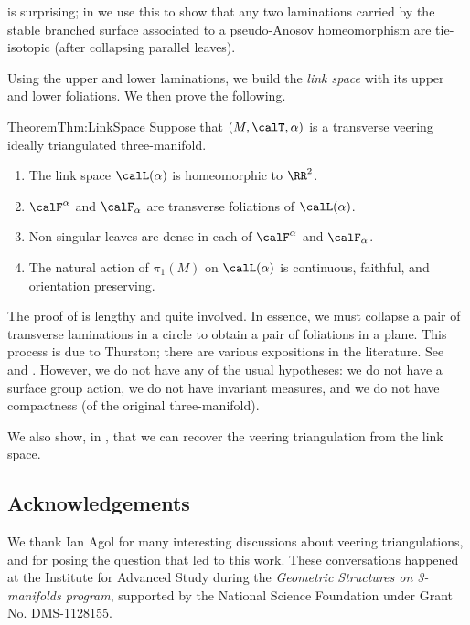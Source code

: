 \documentclass[12pt]{amsart}
\begin{document}
 is surprising; in  we use this to show that any two laminations carried by the stable branched surface associated to a pseudo-Anosov homeomorphism are tie-isotopic (after collapsing parallel leaves).

Using the upper and lower laminations, we build the \emph{link space} with its upper and lower foliations.  We then prove the following.

\begin{restate}{Theorem}{Thm:LinkSpace}
Suppose that $(M, \calT, \alpha)$ is a transverse veering ideally triangulated three-manifold.  
\begin{enumerate}
\item
The link space $\calL(\alpha)$ is homeomorphic to $\RR^2$.  
\item
$\calF^\alpha$ and $\calF_\alpha$ are transverse foliations of $\calL(\alpha)$.  
\item
Non-singular leaves are dense in each of $\calF^\alpha$ and $\calF_\alpha$. 
\item
The natural action of $\pi_1(M)$ on $\calL(\alpha)$ is continuous, faithful, and orientation preserving.
\end{enumerate}
\end{restate}

The proof of  is lengthy and quite involved.  In essence, we must collapse a pair of transverse laminations in a circle to obtain a pair of foliations in a plane.  This process is due to Thurston; there are various expositions in the literature.  See \cite[Chapter~6]{CassonBleiler88} and \cite[Section~11.9]{Kapovich09}.  However, we do not have any of the usual hypotheses: 
we do not have a surface group action,
we do not have invariant measures, 
and we do not have compactness (of the original three-manifold). 


We also show, in , that we can recover the veering triangulation from the link space.

\subsection*{Acknowledgements}
We thank Ian Agol for many interesting discussions about veering triangulations, and for posing the question that led to this work. These conversations happened at the Institute for Advanced Study during the \emph{Geometric Structures on 3-manifolds program}, supported by the National Science Foundation under Grant No. DMS-1128155.
\end{document}
